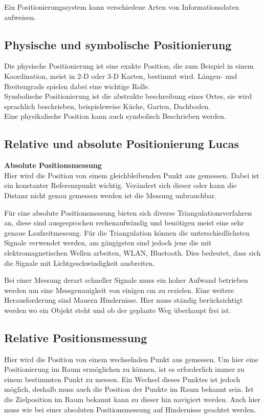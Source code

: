     Ein Positionierungssystem kann verschiedene Arten von Informationsdaten aufweisen. \cite{pos_eigenschaften}

    \subsection*{Physische und symbolische Positionierung}
    Die physische Positionierung ist eine exakte Position, die zum Beispiel in einem Koordination, meist in 2-D oder 3-D Karten, bestimmt wird. Längen- und Breitengrade spielen dabei eine wichtige Rolle.\\
    Symbolische Positionierung ist die abstrakte beschreibung eines Ortes, sie wird sprachlich beschrieben, beispielsweise Küche, Garten, Dachboden.\\
    Eine physikalische Position kann auch symbolisch Beschrieben werden.
    
    \subsection*{Relative und absolute Positionierung Lucas}
    \textbf{Absolute Positionsmessung}\\
    Hier wird die Position von einem gleichbleibenden Punkt aus gemessen. Dabei ist ein konstanter Referenzpunkt wichtig.
    Verändert sich dieser oder kann die Distanz nicht genau gemessen werden ist die Messung unbrauchbar.

    Für eine absolute Positionsmessung bieten sich diverse Triangulationsverfahren an,
    diese sind ausgesprochen rechenaufwändig und benötigen meist eine sehr genaue Laufzeitmessung.
    Für die Triangulation können die unterschiedlichsten Signale verwendet werden, am gängigsten sind jedoch jene die mit elektromagnetischen Wellen arbeiten,
    \zB WLAN, Bluetooth. Dies bedeutet, dass sich die Signale mit Lichtgeschwindigkeit ausbreiten.

    Bei einer Messung derart schneller Signale muss ein hoher Aufwand betrieben werden um eine Messgenauigkeit von einigen cm zu erzielen.
    Eine weitere Herausforderung sind Mauern \bzw Hindernisse. Hier muss ständig berücksichtigt werden wo ein Objekt steht und ob der geplante Weg überhaupt frei ist.

    \subsection*{Relative Positionsmessung}
    Hier wird die Position von einem wechselnden Punkt aus gemessen. Um hier eine Positionierung im Raum ermöglichen zu können,
    ist es erforderlich immer zu einem bestimmten Punkt zu messen. Ein Wechsel dieses Punktes ist jedoch möglich,
    deshalb muss auch die Position der Punkte im Raum bekannt sein. Ist die Zielposition im Raum bekannt kann zu dieser hin navigiert werden.
    Auch hier muss wie bei einer absoluten Positionsmessung auf Hindernisse geachtet werden.

